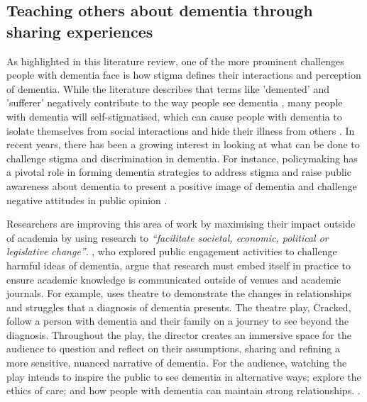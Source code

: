 \subsection{Teaching others about dementia through sharing experiences}
\label{BL:PublicPerception}
As highlighted in this literature review, one of the more prominent challenges people with dementia face is how stigma defines their interactions and perception of dementia. While the literature describes that terms like 'demented' and 'sufferer' negatively contribute to the way people see dementia \citep{peel2014living}, many people with dementia will self-stigmatised, which can cause people with dementia to isolate themselves from social interactions and hide their illness from others \citep{milne2010d}. In recent years, there has been a growing interest in looking at what can be done to challenge stigma and discrimination in dementia. For instance, policymaking has a pivotal role in forming dementia strategies to address stigma and raise public awareness about dementia to present a positive image of dementia and challenge negative attitudes in public opinion \citep{kontos_raising_2018,herrmann_systematic_2018}. 

Researchers are improving this area of work by maximising their impact outside of academia by using research to \textit{``facilitate societal, economic, political or legislative change''}. \cite{tischler2020using}, who explored public engagement activities to challenge harmful ideas of dementia, argue that research must embed itself in practice to ensure academic knowledge is communicated outside of venues and academic journals. For example, \cite{kontos_raising_2018} uses theatre to demonstrate the changes in relationships and struggles that a diagnosis of dementia presents. The theatre play, Cracked, follow a person with dementia and their family on a journey to see beyond the diagnosis. Throughout the play, the director creates an immersive space for the audience to question and reflect on their assumptions, sharing and refining a more sensitive, nuanced narrative of dementia. For the audience, watching the play intends to inspire the public to see dementia in alternative ways; explore the ethics of care; and how people with dementia can maintain strong relationships.  \citep{gray2020knowledge}.

